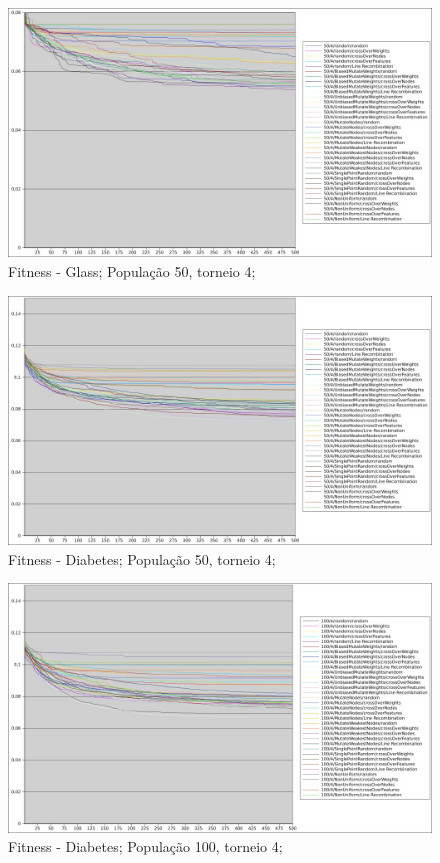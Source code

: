 \documentclass[12pt]{article}
\begin{document}
\begin{figure}[hbp]
\center
\includegraphics[scale=0.4, keepaspectratio]{glass_50_4.jpg} 
\caption{Fitness - Glass; População 50, torneio 4;}
\label{fig:gla50.4}
\end{figure}

\begin{figure}[htp]
\center
\includegraphics[scale=0.4, keepaspectratio]{dia_50_4.jpg} 
\caption{Fitness - Diabetes; População 50, torneio 4;}
\label{fig:dia50.4}
\end{figure}

\begin{figure}[hbp]
\center
\includegraphics[scale=0.4, keepaspectratio]{dia_100_4.jpg} 
\caption{Fitness - Diabetes; População 100, torneio 4;}
\label{fig:dia100.4}
\end{figure}
\end{document}
